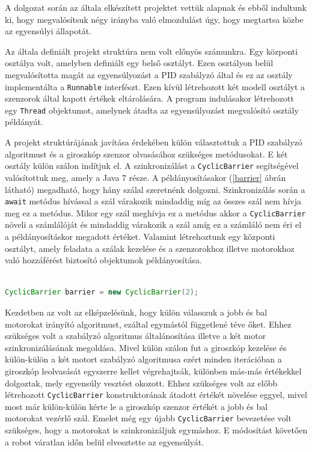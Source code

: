 A dolgozat során az általa elkészített projektet vettük alapnak és ebből indultunk ki, hogy megvalósítsuk négy irányba való elmozdulást úgy, hogy megtartsa közbe az egyensúlyi állapotát.

Az általa definiált projekt struktúra nem volt előnyös számunkra. Egy központi osztálya volt, amelyben definiált egy belső osztályt. Ezen osztályon belül megvalósította magát az egyensúlyozást a PID szabályzó által és ez az osztály implementálta a \texttt{Runnable} interfészt. Ezen kívül létrehozott két modell osztályt a szenzorok által kapott értékek eltárolására. A program indulásakor létrehozott egy \texttt{Thread} objektumot, amelynek átadta az egyensúlyozást megvalósító osztály példányát. 

A projekt struktúrájának javítása érdekében külön választottuk a PID szabályzó algoritmust és a giroszkóp szenzor olvasásához szükséges metódusokat. E két osztály külön szálon indítjuk el. A szinkronizálást a \texttt{CyclicBarrier} segítségével valósítottuk meg, amely a Java 7 része. A példányosításakor (\ref{barrier} ábrán látható) megadható, hogy hány szálal szeretnénk dolgozni. Szinkronizálás során a \texttt{await} metódus hívással a szál várakozik mindaddig míg az összes szál nem hívja meg ez a metódus. Mikor egy szál meghívja ez a metódus akkor a \texttt{CyclicBarrier} növeli a számlálóját és mindaddig várakozik a szál amíg ez a számláló nem éri el a példányosításkor megadott értéket. Valamint létrehoztunk egy központi osztályt, amely feladata a szálak kezelése és a szenzorokhoz illetve motorokhoz való hozzáférést biztosító objektumok példányosítása.

\begin{lstlisting}[label=barrier, caption= CyclicBarrier példányosítása , language=Java]

CyclicBarrier barrier = new CyclicBarrier(2);

\end{lstlisting}

Kezdetben az volt az elképzelésünk, hogy külön válasszuk a jobb és bal motorokat irányító algoritmust, ezáltal egymástól függetlené téve őket. Ehhez szükséges volt a szabályzó algoritmus általánosítása illetve a két motor szinkronizálásának megoldása. Mivel külön szálon fut a giroszkóp kezelése és külön-külön a két motort szabályzó algoritmusa ezért minden iterációban a giroszkóp leolvasását egyszerre kellet végrehajtsák, különben más-más értékekkel dolgoztak, mely egyensúly vesztést okozott. Ehhez szükséges volt az előbb létrehozott \texttt{CyclicBarrier} konstruktorának átadott értékét növelése eggyel, mivel most már külön-külön kérte le a giroszkóp szenzor értékét a jobb és bal motorokat vezérlő szál. Emelet még egy újabb \texttt{CyclicBarrier} bevezetése volt szükséges, hogy a motorokat is szinkronizáljuk egymáshoz. E módosítást követően a robot váratlan időn belül elvesztette az egyensúlyát.


